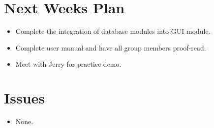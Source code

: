 \section{Next Weeks Plan}
\begin{itemize}
	\item Complete the integration of database modules into GUI module.
	\item Complete user manual and have all group members proof-read.
	\item Meet with Jerry for practice demo.
\end{itemize}

%
%
%
\section{Issues}
\begin{itemize}
	\item None.
\end{itemize}


